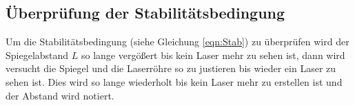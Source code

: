 \subsection{Überprüfung der Stabilitätsbedingung}
Um die Stabilitätsbedingung (siehe Gleichung \eqref{eqn:Stab}) zu überprüfen wird der Spiegelabstand $L$ so lange vergößert bis kein Laser mehr zu sehen ist, dann wird versucht die Spiegel und die Laserröhre so zu justieren bis wieder ein Laser zu sehen ist. Dies wird so lange wiederholt bis kein Laser mehr zu erstellen ist und der Abstand wird notiert.
